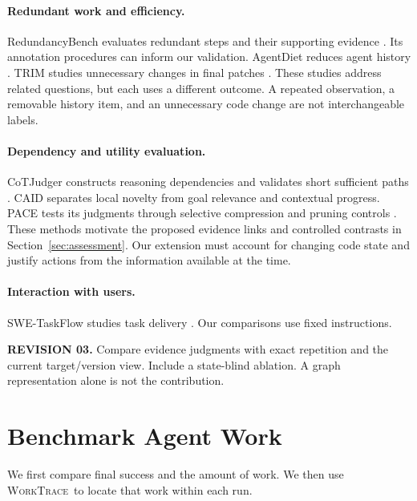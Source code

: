 \documentclass[10pt,a4paper,twocolumn]{article}
\newcommand{\rev}[2]{\par\smallskip\noindent\begin{minipage}{\linewidth}\color{revision}\footnotesize\textbf{REVISION #1.} #2\end{minipage}\par\smallskip}
\newcommand{\wt}{\textsc{WorkTrace}}
\begin{document}
\paragraph{Redundant work and efficiency.}
RedundancyBench evaluates redundant steps and their supporting evidence \citep{redundancybench}. Its annotation procedures can inform our validation. AgentDiet reduces agent history \citep{agentdiet}. TRIM studies unnecessary changes in final patches \citep{trim}. These studies address related questions, but each uses a different outcome. A repeated observation, a removable history item, and an unnecessary code change are not interchangeable labels.
\paragraph{Dependency and utility evaluation.}
CoTJudger constructs reasoning dependencies and validates short sufficient paths \citep{cotjudger}. CAID separates local novelty from goal relevance and contextual progress. PACE tests its judgments through selective compression and pruning controls \citep{caid}. These methods motivate the proposed evidence links and controlled contrasts in Section~\ref{sec:assessment}. Our extension must account for changing code state and justify actions from the information available at the time.
\paragraph{Interaction with users.}
SWE-TaskFlow studies task delivery \citep{taskflow}. Our comparisons use fixed instructions.
\rev{03}{Compare evidence judgments with exact repetition and the current target/version view. Include a state-blind ablation. A graph representation alone is not the contribution.}

\section{Benchmark Agent Work}
We first compare final success and the amount of work. We then use \wt\ to locate that work within each run.
\end{document}
